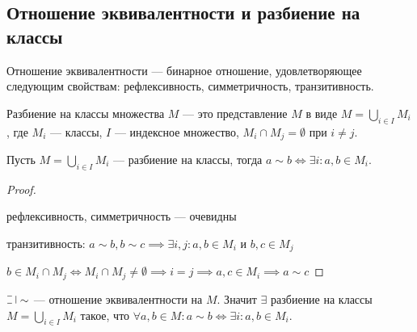 \subsection{Отношение эквивалентности и разбиение на классы}

\begin{defn}
    Отношение эквивалентности --- бинарное отношение, удовлетворяющее следующим свойствам: рефлексивность, симметричность, транзитивность.
\end{defn}

\begin{defn}
    Разбиение на классы множества $M$ --- это представление $M$ в виде $M = \bigcup\limits_{i \in I} M_i$, где $M_i$ --- классы, $I$ --- индексное множество, $M_i \cap M_j = \emptyset$ при $i \neq j$.
\end{defn}

\begin{theorem}
    Пусть $M = \bigcup\limits_{i \in I} M_i$ --- разбиение на классы, тогда $a \sim b \iff \exists i : a, b \in M_i$.
\end{theorem}

\begin{proof}~

    рефлексивность, симметричность --- очевидны
    
    транзитивность: $a \sim b, b \sim c \implies \exists i, j : a, b \in M_i$ и $b, c \in M_j$
    
    $b \in M_i \cap M_j \iff M_i \cap M_j \neq \emptyset \implies i = j \implies a, c \in M_i \implies a \sim c$
\end{proof}

\begin{theorem}
    $\letus \sim$ --- отношение эквивалентности на $M$. Значит $\exists$ разбиение на классы $M = \bigcup\limits_{i \in I} M_i$ такое, что $\forall a, b \in M: a \sim b \iff \exists i : a, b \in M_i$.
\end{theorem}

